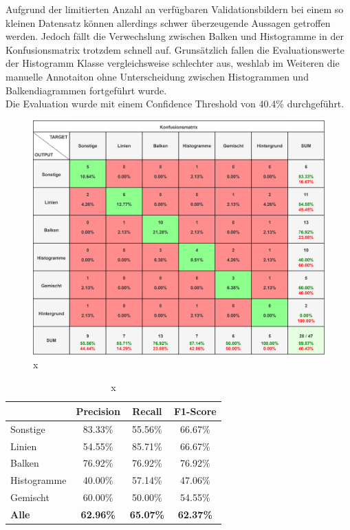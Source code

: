 Aufgrund der limitierten Anzahl an verfügbaren Validationsbildern bei einem so kleinen Datensatz können allerdings schwer überzeugende Aussagen getroffen werden.
Jedoch fällt die Verwechslung zwischen Balken und Histogramme in der Konfusionsmatrix trotzdem schnell auf. Grunsätzlich fallen die Evaluationswerte der Histogramm Klasse vergleichsweise schlechter aus, weshlab im Weiteren die manuelle Annotaiton ohne Unterscheidung zwischen Histogrammen und Balkendiagrammen fortgeführt wurde.
\\
Die Evaluation wurde mit einem Confidence Threshold von 40.4\% durchgeführt.
\begin{figure}[H]
    \centering
    \captionsetup{width=1\linewidth}
    \includegraphics[width=1\textwidth]{Experimente/img/detect/1_val@0.404_200_histo/konfusionsmatrix.png}
    \caption{ x}
    \label{fig:extraction_output}
\end{figure}

\begin{table}[H]
    \centering
    \begin{tabular}{|l|c|c|c|}
        \hline
        \rowcolor[HTML]{EFEFEF}
                      & Precision        & Recall           & F1-Score         \\ \hline
        Sonstige      & 83.33\%          & 55.56\%          & 66.67\%          \\ \hline
        Linien        & 54.55\%          & 85.71\%          & 66.67\%          \\ \hline
        Balken        & 76.92\%          & 76.92\%          & 76.92\%          \\ \hline
        Histogramme   & 40.00\%          & 57.14\%          & 47.06\%          \\ \hline
        Gemischt      & 60.00\%          & 50.00\%          & 54.55\%          \\ \hline
        \textbf{Alle} & \textbf{62.96\%} & \textbf{65.07\%} & \textbf{62.37\%} \\ \hline
    \end{tabular}
    \caption{x}
\end{table}


